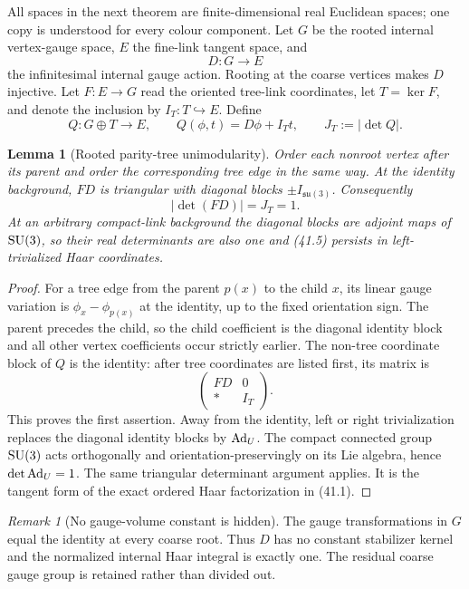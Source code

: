 \documentclass[11pt,oneside]{book}
\newtheorem{lemma}[theorem]{Lemma}
\theoremstyle{definition}
\theoremstyle{remark}
\newtheorem{remark}[theorem]{Remark}
\begin{document}
All spaces in the next theorem are finite-dimensional real Euclidean
spaces; one copy is understood for every colour component.  Let
\(G\) be the rooted internal vertex-gauge space, \(E\) the fine-link
tangent space, and
\[
 D:G\longrightarrow E                                             \tag{41.3}
\]
the infinitesimal internal gauge action.  Rooting at the coarse
vertices makes \(D\) injective.  Let \(F:E\to G\) read the oriented
tree-link coordinates, let \(T=\ker F\), and denote the inclusion by
\(I_T:T\hookrightarrow E\).  Define
\[
 Q:G\oplus T\longrightarrow E,
 \qquad Q(\phi,t)=D\phi+I_Tt,
 \qquad J_T:=|\det Q|.                                           \tag{41.4}
\]

\begin{lemma}[Rooted parity-tree unimodularity]
\label{lem:e8v41-tree-unimodular}
Order each nonroot vertex after its parent and order the corresponding
tree edge in the same way.  At the identity background,
\(FD\) is triangular with diagonal blocks \(\pm I_{\mathfrak{su}(3)}\).
Consequently
\[
 |\det(FD)|=J_T=1.                                                \tag{41.5}
\]
At an arbitrary compact-link background the diagonal blocks are
adjoint maps of \({\rm SU}(3)\), so their real determinants are also
one and (41.5) persists in left-trivialized Haar coordinates.
\end{lemma}

\begin{proof}
For a tree edge from the parent \(p(x)\) to the child \(x\), its
linear gauge variation is
\(\phi_x-\phi_{p(x)}\) at the identity, up to the fixed orientation
sign.  The parent precedes the child, so the child coefficient is the
diagonal identity block and all other vertex coefficients occur
strictly earlier.  The non-tree coordinate block of \(Q\) is the
identity: after tree coordinates are listed first, its matrix is
\[
 \begin{pmatrix}FD&0\\ *&I_T\end{pmatrix}.
\]
This proves the first assertion.  Away from the identity, left or
right trivialization replaces the diagonal identity blocks by
\({\rm Ad}_U\).  The compact connected group \({\rm SU}(3)\) acts
orthogonally and orientation-preservingly on its Lie algebra, hence
\(\det{\rm Ad}_U=1\).  The same triangular determinant argument
applies.  It is the tangent form of the exact ordered Haar
factorization in (41.1).
\end{proof}

\begin{remark}[No gauge-volume constant is hidden]
\label{rem:e8v41-no-volume}
The gauge transformations in \(G\) equal the identity at every
coarse root.  Thus \(D\) has no constant stabilizer kernel and the
normalized internal Haar integral is exactly one.  The residual
coarse gauge group is retained rather than divided out.
\end{remark}
\end{document}
